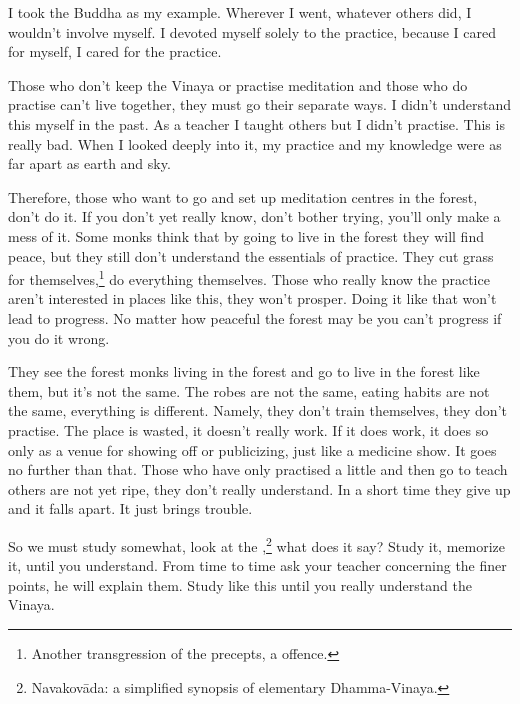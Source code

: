 I took the Buddha as my example. Wherever I went, whatever others did, I wouldn't involve myself. I devoted myself solely to the practice, because I cared for myself, I cared for the practice. 

Those who don't keep the Vinaya or practise meditation and those who do practise can't live together, they must go their separate ways. I didn't understand this myself in the past. As a teacher I taught others but I didn't practise. This is really bad. When I looked deeply into it, my practice and my knowledge were as far apart as earth and sky. 

Therefore, those who want to go and set up meditation centres in the forest, don't do it. If you don't yet really know, don't bother trying, you'll only make a mess of it. Some monks think that by going to live in the forest they will find peace, but they still don't understand the essentials of practice. They cut grass for themselves,\footnote{Another transgression of the precepts, a  offence.} do everything themselves. Those who really know the practice aren't interested in places like this, they won't prosper. Doing it like that won't lead to progress. No matter how peaceful the forest may be you can't progress if you do it wrong. 

They see the forest monks living in the forest and go to live in the forest like them, but it's not the same. The robes are not the same, eating habits are not the same, everything is different. Namely, they don't train themselves, they don't practise. The place is wasted, it doesn't really work. If it does work, it does so only as a venue for showing off or publicizing, just like a medicine show. It goes no further than that. Those who have only practised a little and then go to teach others are not yet ripe, they don't really understand. In a short time they give up and it falls apart. It just brings trouble. 

So we must study somewhat, look at the ,\footnote{Navakov\=ada: a simplified synopsis of elementary Dhamma-Vinaya.} what does it say? Study it, memorize it, until you understand. From time to time ask your teacher concerning the finer points, he will explain them. Study like this until you really understand the Vinaya. 

